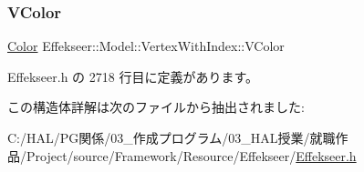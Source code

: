 \subsubsection{\texorpdfstring{V\+Color}{VColor}}
{\footnotesize\ttfamily \mbox{\hyperlink{struct_effekseer_1_1_color}{Color}} Effekseer\+::\+Model\+::\+Vertex\+With\+Index\+::\+V\+Color}



 Effekseer.\+h の 2718 行目に定義があります。



この構造体詳解は次のファイルから抽出されました\+:\begin{DoxyCompactItemize}
\item 
C\+:/\+H\+A\+L/\+P\+G関係/03\+\_\+作成プログラム/03\+\_\+\+H\+A\+L授業/就職作品/\+Project/source/\+Framework/\+Resource/\+Effekseer/\mbox{\hyperlink{_effekseer_8h}{Effekseer.\+h}}\end{DoxyCompactItemize}
